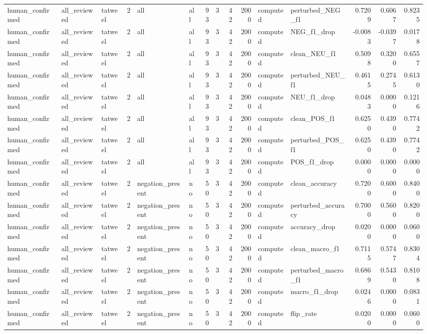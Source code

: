 \begin{tabular}{lllrllrrrrllrrr}
human_confirmed & all_reviewed & tatweel & 2 & all & all & 93 & 3 & 42 & 2000 & computed & perturbed_NEG_f1 & 0.7209 & 0.6067 & 0.8235 \\
human_confirmed & all_reviewed & tatweel & 2 & all & all & 93 & 3 & 42 & 2000 & computed & NEG_f1_drop & -0.0083 & -0.0397 & 0.0178 \\
human_confirmed & all_reviewed & tatweel & 2 & all & all & 93 & 3 & 42 & 2000 & computed & clean_NEU_f1 & 0.5098 & 0.3200 & 0.6557 \\
human_confirmed & all_reviewed & tatweel & 2 & all & all & 93 & 3 & 42 & 2000 & computed & perturbed_NEU_f1 & 0.4615 & 0.2745 & 0.6130 \\
human_confirmed & all_reviewed & tatweel & 2 & all & all & 93 & 3 & 42 & 2000 & computed & NEU_f1_drop & 0.0483 & 0.0000 & 0.1216 \\
human_confirmed & all_reviewed & tatweel & 2 & all & all & 93 & 3 & 42 & 2000 & computed & clean_POS_f1 & 0.6250 & 0.4390 & 0.7742 \\
human_confirmed & all_reviewed & tatweel & 2 & all & all & 93 & 3 & 42 & 2000 & computed & perturbed_POS_f1 & 0.6250 & 0.4390 & 0.7742 \\
human_confirmed & all_reviewed & tatweel & 2 & all & all & 93 & 3 & 42 & 2000 & computed & POS_f1_drop & 0.0000 & 0.0000 & 0.0000 \\
human_confirmed & all_reviewed & tatweel & 2 & negation_present & no & 50 & 3 & 42 & 2000 & computed & clean_accuracy & 0.7200 & 0.6000 & 0.8400 \\
human_confirmed & all_reviewed & tatweel & 2 & negation_present & no & 50 & 3 & 42 & 2000 & computed & perturbed_accuracy & 0.7000 & 0.5600 & 0.8200 \\
human_confirmed & all_reviewed & tatweel & 2 & negation_present & no & 50 & 3 & 42 & 2000 & computed & accuracy_drop & 0.0200 & 0.0000 & 0.0600 \\
human_confirmed & all_reviewed & tatweel & 2 & negation_present & no & 50 & 3 & 42 & 2000 & computed & clean_macro_f1 & 0.7115 & 0.5747 & 0.8304 \\
human_confirmed & all_reviewed & tatweel & 2 & negation_present & no & 50 & 3 & 42 & 2000 & computed & perturbed_macro_f1 & 0.6869 & 0.5430 & 0.8108 \\
human_confirmed & all_reviewed & tatweel & 2 & negation_present & no & 50 & 3 & 42 & 2000 & computed & macro_f1_drop & 0.0246 & 0.0000 & 0.0831 \\
human_confirmed & all_reviewed & tatweel & 2 & negation_present & no & 50 & 3 & 42 & 2000 & computed & flip_rate & 0.0200 & 0.0000 & 0.0600 \\

\end{tabular}
